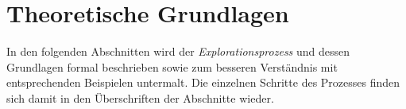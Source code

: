 \chapter{Theoretische Grundlagen}\label{chap_foundation}
In den folgenden Abschnitten wird der \emph{Explorationsprozess} und dessen Grundlagen formal beschrieben sowie zum besseren Verständnis mit entsprechenden Beispielen untermalt. Die einzelnen Schritte des Prozesses finden sich damit in den  Überschriften der Abschnitte wieder.






